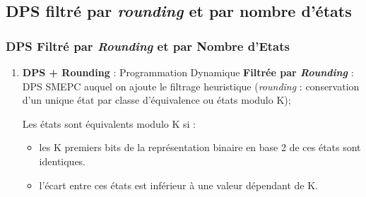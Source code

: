 \documentclass[hyperref={bookmarks=false},aspectratio=169]{beamer}
\begin{document}

\subsection{DPS filtré par \textit{rounding} et par nombre d’états}
\begin{frame}
\frametitle{DPS Filtré par \textit{Rounding} et par Nombre d’Etats}
\begin{enumerate}
\item \textbf{DPS + Rounding} : Programmation Dynamique \textbf{Filtrée par \textit{Rounding}} : DPS SMEPC auquel on ajoute le filtrage heuristique (\textit{rounding} : conservation d'un unique état par classe d’équivalence ou états modulo K); 

Les états sont équivalents modulo K si :
\begin{itemize}
\item les K premiers bits de la représentation binaire en base 2 de ces états sont identiques.
\item l'écart entre ces états est inférieur à une valeur dépendant de K.
\end{itemize}


\end{enumerate}
\end{frame}
\end{document}
